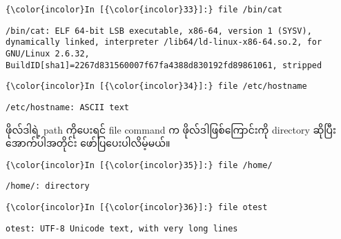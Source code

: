 \documentclass[11pt]{article}
\begin{document}
    \begin{Verbatim}[commandchars=\\\{\}]
{\color{incolor}In [{\color{incolor}33}]:} file /bin/cat
\end{Verbatim}

    \begin{Verbatim}[commandchars=\\\{\}]
/bin/cat: ELF 64-bit LSB executable, x86-64, version 1 (SYSV), dynamically linked, interpreter /lib64/ld-linux-x86-64.so.2, for GNU/Linux 2.6.32, BuildID[sha1]=2267d831560007f67fa4388d830192fd89861061, stripped

    \end{Verbatim}

    \begin{Verbatim}[commandchars=\\\{\}]
{\color{incolor}In [{\color{incolor}34}]:} file /etc/hostname
\end{Verbatim}

    \begin{Verbatim}[commandchars=\\\{\}]
/etc/hostname: ASCII text

    \end{Verbatim}

    ဖိုလ်ဒါရဲ့ path ကိုပေးရင် file command က ဖိုလ်ဒါဖြစ်ကြောင်းကို directory
ဆိုပြီး အောက်ပါအတိုင်း ဖော်ပြပေးပါလိမ့်မယ်။

    \begin{Verbatim}[commandchars=\\\{\}]
{\color{incolor}In [{\color{incolor}35}]:} file /home/
\end{Verbatim}

    \begin{Verbatim}[commandchars=\\\{\}]
/home/: directory

    \end{Verbatim}

    \begin{Verbatim}[commandchars=\\\{\}]
{\color{incolor}In [{\color{incolor}36}]:} file otest
\end{Verbatim}

    \begin{Verbatim}[commandchars=\\\{\}]
otest: UTF-8 Unicode text, with very long lines

    \end{Verbatim}
\end{document}
